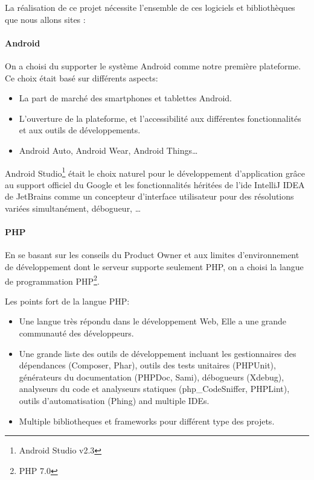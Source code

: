 La réalisation de ce projet nécessite l'ensemble de ces logiciels et
bibliothèques que nous allons sites :

\paragraph{Android}

On a choisi du supporter le système Android comme notre première plateforme. Ce
choix était basé sur différents aspects:
\begin{itemize}
    \item La part de marché des smartphones et tablettes Android.
    \item L'ouverture de la plateforme, et l'accessibilité aux différentes
        fonctionnalités et aux outils de développements.
    \item Android Auto, Android Wear, Android Things\ldots
\end{itemize}

Android Studio\footnote{Android Studio v2.3} était le choix naturel pour le
développement d'application grâce au support officiel du Google et les
fonctionnalités héritées de l'ide IntelliJ IDEA de JetBrains comme un
concepteur d’interface utilisateur pour des résolutions variées simultanément,
débogueur, \ldots


\paragraph{PHP}
En se basant sur les conseils du Product Owner et aux limites d'environnement
de développement dont le serveur supporte seulement PHP, on a choisi la langue
de programmation PHP\footnote{PHP 7.0}.

Les points fort de la langue PHP:
\begin{itemize}
    \item Une langue très répondu dans le développement Web, Elle a une
        grande communauté des développeurs.
    \item Une grande liste des outils de développement incluant les
        gestionnaires des dépendances (Composer, Phar), outils des tests
        unitaires (PHPUnit), générateurs du documentation (PHPDoc, Sami),
        débogueurs (Xdebug), analyseurs du code et analyseurs statiques
        (php\_CodeSniffer, PHPLint), outils d'automatisation (Phing) and
        multiple IDEs.
    \item Multiple bibliotheques et frameworks pour différent type des projets.
\end{itemize}

